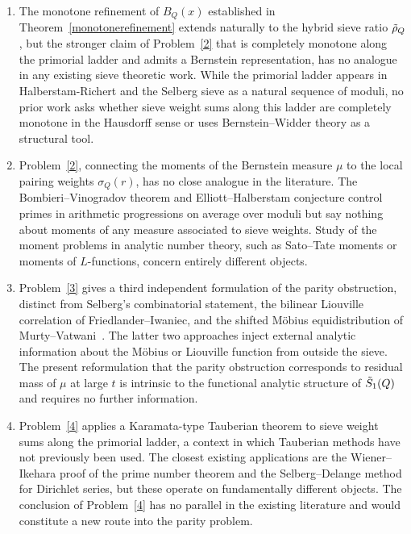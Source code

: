 \documentclass[11pt,reqno]{amsart}
\theoremstyle{plain}\newtheorem{theorem}{Theorem}[section]
\numberwithin{equation}{section}
\begin{document}
\begin{enumerate}
\item The monotone refinement of $B_Q(x)$ established in Theorem~\ref{monotonerefinement} extends naturally to the hybrid sieve ratio $\Tilde{\rho}_Q$, but the stronger claim of Problem~\ref{2} that is completely monotone along the primorial ladder and admits a Bernstein representation, has no analogue in any existing sieve theoretic work. While the primorial ladder appears in Halberstam-Richert and the Selberg sieve as a natural sequence of moduli, no prior work asks whether sieve weight sums along this ladder are completely monotone in the Hausdorff sense or uses Bernstein–Widder theory as a structural tool.

\medskip
\item Problem~\ref{2}, connecting the moments of the Bernstein measure $\mu$ to the local pairing weights $\sigma_Q(r)$, has no close analogue in the literature. The Bombieri–Vinogradov theorem and Elliott–Halberstam conjecture control primes in arithmetic progressions on average over moduli but say nothing about moments of any measure associated to sieve weights. Study of the moment problems in analytic number theory, such as Sato–Tate moments or moments of $L$-functions, concern entirely different objects.

\medskip
\item Problem~\ref{3} gives a third independent formulation of the parity obstruction, distinct from Selberg's combinatorial statement, the bilinear Liouville correlation of Friedlander–Iwaniec, and the shifted M\"{o}bius equidistribution of Murty–Vatwani~\cite{murty}. The latter two approaches inject external analytic information about the M\"{o}bius or Liouville function from outside the sieve. The present reformulation that the parity obstruction corresponds to residual mass of $\mu$ at large $t$ is  intrinsic to the functional analytic structure of $\Tilde{S}_1(Q)$ and requires no further information.

\medskip
\item Problem~\ref{4} applies a Karamata-type Tauberian theorem to sieve weight sums along the primorial ladder, a context in which Tauberian methods have not previously been used. The closest existing applications are the Wiener–Ikehara proof of the prime number theorem and the Selberg–Delange method for Dirichlet series, but these operate on fundamentally different objects. The conclusion of Problem~\ref{4} has no parallel in the existing literature and would constitute a new route into the parity problem.
\end{enumerate}
\end{document}
